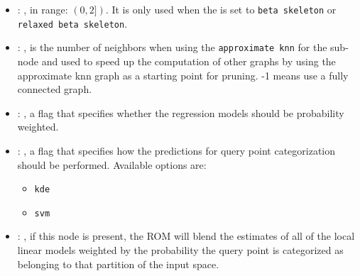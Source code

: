 \begin{itemize}
    \item {}: ,
      in range: $(0, 2])$. It is                                                  only used when the
       is set to \texttt{beta skeleton} or
      \texttt{relaxed beta skeleton}.

    \item {}: ,
      is the number of                                                  neighbors when using the
      \texttt{approximate knn} for the 
      sub-node and used to speed up the computation of other graphs by using the
      approximate knn graph as a starting point for pruning. -1 means use a fully
      connected graph.

    \item {}: ,
      a flag that specifies                                                  whether the regression
      models should be probability weighted.

    \item {}: ,
      a flag that                                                  specifies how the predictions for
      query point categorization  should be
      performed. Available options are:
      \begin{itemize}                                                    \item \texttt{kde}
      \item \texttt{svm}                                                  \end{itemize}

    \item {}: ,
      if this node is present, the ROM will blend the
      estimates of all of the local linear models weighted by the probability the
      query point is categorized as belonging to that partition of the input space.


\end{itemize}
